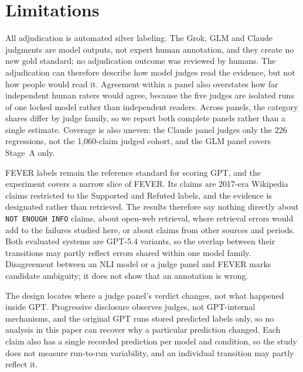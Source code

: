 \section{Limitations}
\label{sec:limitations}

All adjudication is automated silver labeling.
The Grok, GLM and Claude judgments are model outputs, not expert human annotation, and they create no new gold standard; no adjudication outcome was reviewed by humans.
The adjudication can therefore describe how model judges read the evidence, but not how people would read it.
Agreement within a panel also overstates how far independent human raters would agree, because the five judges are isolated runs of one locked model rather than independent readers.
Across panels, the category shares differ by judge family, so we report both complete panels rather than a single estimate.
Coverage is also uneven: the Claude panel judges only the 226 regressions, not the 1{,}060-claim judged cohort, and the GLM panel covers Stage~A only.

FEVER labels remain the reference standard for scoring GPT, and the experiment covers a narrow slice of FEVER.
Its claims are 2017-era Wikipedia claims restricted to the Supported and Refuted labels, and the evidence is designated rather than retrieved.
The results therefore say nothing directly about \texttt{NOT ENOUGH INFO} claims, about open-web retrieval, where retrieval errors would add to the failures studied here, or about claims from other sources and periods.
Both evaluated systems are GPT-5.4 variants, so the overlap between their transitions may partly reflect errors shared within one model family.
Disagreement between an NLI model or a judge panel and FEVER marks candidate ambiguity; it does not show that an annotation is wrong.

The design locates where a judge panel's verdict changes, not what happened inside GPT.
Progressive disclosure observes judges, not GPT-internal mechanisms, and the original GPT runs stored predicted labels only, so no analysis in this paper can recover why a particular prediction changed.
Each claim also has a single recorded prediction per model and condition, so the study does not measure run-to-run variability, and an individual transition may partly reflect it.

